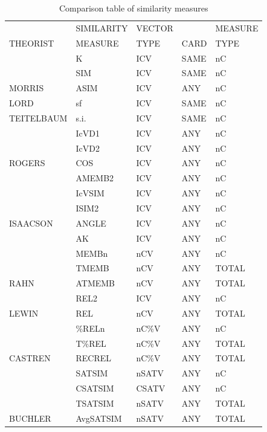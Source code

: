 \documentclass{article}
\begin{document}
\begin{table}[htb]
\caption{Comparison table of similarity measures} 
\begin{center}
\begin{tabular}{lllll}
\hline
             &  SIMILARITY  &  VECTOR  &        &  MEASURE  \\
 THEORIST    &  MEASURE     &  TYPE    &  CARD  &  TYPE     \\
\hline
             &  K           &  ICV     &  SAME  &  nC       \\
             &  SIM         &  ICV     &  SAME  &  nC       \\
 MORRIS      &  ASIM        &  ICV     &  ANY   &  nC       \\
\hline
 LORD        &  sf          &  ICV     &  SAME  &  nC       \\
\hline
 TEITELBAUM  &  s.i.        &  ICV     &  SAME  &  nC       \\
\hline
             &  IcVD1       &  ICV     &  ANY   &  nC       \\
             &  IcVD2       &  ICV     &  ANY   &  nC       \\
 ROGERS      &  COS         &  ICV     &  ANY   &  nC       \\
\hline
             &  AMEMB2      &  ICV     &  ANY   &  nC       \\
             &  IcVSIM      &  ICV     &  ANY   &  nC       \\
             &  ISIM2       &  ICV     &  ANY   &  nC       \\
 ISAACSON    &  ANGLE       &  ICV     &  ANY   &  nC       \\
\hline
             &  AK          &  ICV     &  ANY   &  nC       \\
             &  MEMBn       &  nCV     &  ANY   &  nC       \\
             &  TMEMB       &  nCV     &  ANY   &  TOTAL    \\
 RAHN        &  ATMEMB      &  nCV     &  ANY   &  TOTAL    \\
\hline
             &  REL2        &  ICV     &  ANY   &  nC       \\
 LEWIN       &  REL         &  nCV     &  ANY   &  TOTAL    \\
\hline
             &  \%RELn      &  nC\%V   &  ANY   &  nC       \\
             &  T\%REL      &  nC\%V   &  ANY   &  TOTAL    \\
 CASTREN     &  RECREL      &  nC\%V   &  ANY   &  TOTAL    \\
\hline
             &  SATSIM      &  nSATV   &  ANY   &  nC       \\
             &  CSATSIM     &  CSATV   &  ANY   &  nC       \\
             &  TSATSIM     &  nSATV   &  ANY   &  TOTAL    \\
 BUCHLER     &  AvgSATSIM   &  nSATV   &  ANY   &  TOTAL    \\
\hline
\end{tabular}
\end{center}
\end{table}
\end{document}
